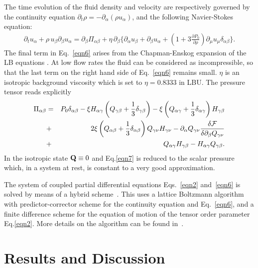 \documentclass[aps,pre,reprint,superscriptaddress]{revtex4}
\begin{document}
The time evolution of the fluid density and velocity are respectively governed
by the continuity equation
$\partial_t \rho = -\partial_\alpha(\rho u_\alpha)$, and
the following Navier-Stokes equation:
\begin{eqnarray}
\partial_t u_\alpha +\rho \,u_\beta \partial_\beta u_\alpha
= \partial_\beta \Pi_{\alpha \beta}
+\eta\, \partial_\beta \{ \partial_\alpha u_\beta + \partial_\beta u_\alpha
+(1+3\frac{\partial P_0}{\partial\rho} )\partial_\mu u_\mu \delta_{\alpha \beta}\}. 
\label{eqn6}
\end{eqnarray}
The final term in Eq.~\ref{eqn6} arises from the Chapman-Enskog expansion
of the LB equations \cite{Denniston:2001}.
At low flow rates the fluid can be considered as incompressible, so that the
last term on the right hand side of Eq.~\ref{eqn6} remains small.
$\eta$ is an isotropic background viscosity which is set to $\eta=0.8333$ in LBU.
The pressure tensor reads explicitly
\begin{eqnarray}
\Pi_{\alpha \beta}&=&P_0 \delta_{\alpha\beta}
-\xi H_{\alpha \gamma}\left(Q_{\gamma \beta} +\frac{1}{3} \delta_{\gamma \beta}\right)-\xi \left(Q_{\alpha \gamma} +\frac{1}{3} \delta_{\alpha \gamma}\right) H_{\gamma \beta}\nonumber\\
&+& 2 \xi  \left(Q_{\alpha \beta} +\frac{1}{3} \delta_{\alpha \beta}\right) Q_{\gamma \nu} H_{\gamma \nu}-\partial_\alpha Q_{\gamma \nu} \frac{\delta{\cal F}}{\delta \partial_{\beta} Q_{\gamma \nu}}\nonumber\\
&+&Q_{\alpha \gamma}H_{\gamma \beta}-H_{\alpha \gamma} Q_{\gamma \beta}.
\label{eqn7}
\end{eqnarray}
In the isotropic state ${\bf Q}\equiv 0$ and Eq.\ref{eqn7} is reduced to the
scalar pressure which, in a system at rest, is constant to a very good
approximation.
 
The system of coupled partial differential equations Eqs.~\ref{eqn2}
and~\ref{eqn6} is solved by means of a
hybrid scheme~\cite{Marenduzzo:2007}. This uses a lattice Boltzmann algorithm
with predictor-corrector scheme for the continuity equation and
Eq.~\ref{eqn6}, and a finite difference scheme for the equation of motion of
the tensor order parameter Eq.\ref{eqn2}. More details on the algorithm can
be found in~\cite{Denniston:2001, Denniston:2004}.

\section{Results and Discussion}
\end{document}
